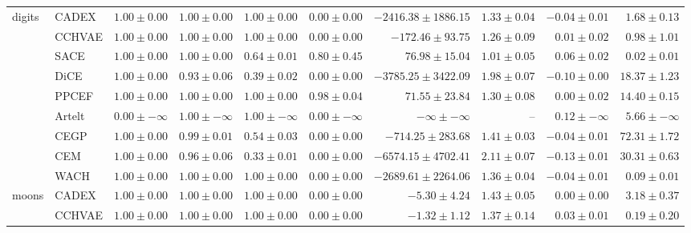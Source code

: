 \begin{table}[ht]
\begin{center}
\begin{sc}
\begin{scriptsize}
\begin{tabular}{l|l|rrrrrrrr}
\midrule
\multirow{9}{*}{digits} & CADEX & $\boldsymbol{1.00\pm{0.00}}$ & $\boldsymbol{1.00\pm{0.00}}$ & $\boldsymbol{1.00\pm{0.00}}$ & $0.00\pm{0.00}$ & $-2416.38\pm{1886.15}$ & $1.33\pm{0.04}$ & $-0.04\pm{0.01}$ & $1.68\pm{0.13}$ \\
 & CCHVAE & $\boldsymbol{1.00\pm{0.00}}$ & $\boldsymbol{1.00\pm{0.00}}$ & $\boldsymbol{1.00\pm{0.00}}$ & $0.00\pm{0.00}$ & $-172.46\pm{93.75}$ & $1.26\pm{0.09}$ & $0.01\pm{0.02}$ & $0.98\pm{1.01}$ \\
 & SACE & $\boldsymbol{1.00\pm{0.00}}$ & $\boldsymbol{1.00\pm{0.00}}$ & $0.64\pm{0.01}$ & $0.80\pm{0.45}$ & $\boldsymbol{76.98\pm{15.04}}$ & $\boldsymbol{1.01\pm{0.05}}$ & $0.06\pm{0.02}$ & $\boldsymbol{0.02\pm{0.01}}$ \\
 & DiCE & $\boldsymbol{1.00\pm{0.00}}$ & $0.93\pm{0.06}$ & $0.39\pm{0.02}$ & $0.00\pm{0.00}$ & $-3785.25\pm{3422.09}$ & $1.98\pm{0.07}$ & $-0.10\pm{0.00}$ & $18.37\pm{1.23}$ \\
 & PPCEF & $\boldsymbol{1.00\pm{0.00}}$ & $\boldsymbol{1.00\pm{0.00}}$ & $\boldsymbol{1.00\pm{0.00}}$ & $\boldsymbol{0.98\pm{0.04}}$ & $71.55\pm{23.84}$ & $1.30\pm{0.08}$ & $0.00\pm{0.02}$ & $14.40\pm{0.15}$ \\
 & Artelt & $0.00\pm{-\infty}$ & $\boldsymbol{1.00\pm{-\infty}}$ & $\boldsymbol{1.00\pm{-\infty}}$ & $0.00\pm{-\infty}$ & $-\infty\pm{-\infty}$ & -- & $\boldsymbol{0.12\pm{-\infty}}$ & $5.66\pm{-\infty}$ \\
 & CEGP & $\boldsymbol{1.00\pm{0.00}}$ & $0.99\pm{0.01}$ & $0.54\pm{0.03}$ & $0.00\pm{0.00}$ & $-714.25\pm{283.68}$ & $1.41\pm{0.03}$ & $-0.04\pm{0.01}$ & $72.31\pm{1.72}$ \\
 & CEM & $\boldsymbol{1.00\pm{0.00}}$ & $0.96\pm{0.06}$ & $0.33\pm{0.01}$ & $0.00\pm{0.00}$ & $-6574.15\pm{4702.41}$ & $2.11\pm{0.07}$ & $-0.13\pm{0.01}$ & $30.31\pm{0.63}$ \\
 & WACH & $\boldsymbol{1.00\pm{0.00}}$ & $\boldsymbol{1.00\pm{0.00}}$ & $\boldsymbol{1.00\pm{0.00}}$ & $0.00\pm{0.00}$ & $-2689.61\pm{2264.06}$ & $1.36\pm{0.04}$ & $-0.04\pm{0.01}$ & $0.09\pm{0.01}$ \\
\midrule
\multirow{9}{*}{moons} & CADEX & $\boldsymbol{1.00\pm{0.00}}$ & $\boldsymbol{1.00\pm{0.00}}$ & $\boldsymbol{1.00\pm{0.00}}$ & $0.00\pm{0.00}$ & $-5.30\pm{4.24}$ & $1.43\pm{0.05}$ & $0.00\pm{0.00}$ & $3.18\pm{0.37}$ \\
 & CCHVAE & $\boldsymbol{1.00\pm{0.00}}$ & $\boldsymbol{1.00\pm{0.00}}$ & $\boldsymbol{1.00\pm{0.00}}$ & $0.00\pm{0.00}$ & $-1.32\pm{1.12}$ & $1.37\pm{0.14}$ & $0.03\pm{0.01}$ & $0.19\pm{0.20}$ \\

\end{tabular}
\end{scriptsize}
\end{sc}
\end{center}
\end{table}
